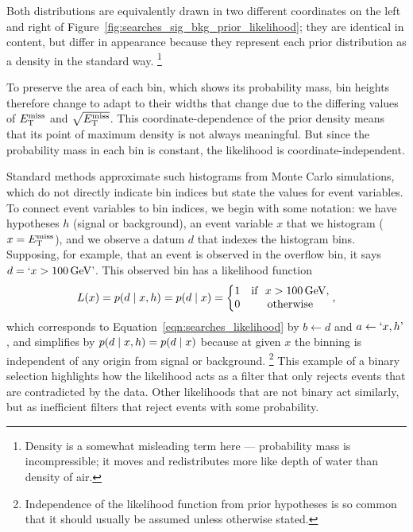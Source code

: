 Both distributions are equivalently drawn in two different coordinates
on the left and right of Figure~\ref{fig:searches_sig_bkg_prior_likelihood};
they are identical in content, but differ in appearance because they represent
each prior distribution as a density in the standard way.%
\footnote{%
Density is a somewhat misleading term here ---
probability mass is incompressible; it moves and redistributes more like
depth of water than density of air.%
}

To preserve the area of each bin, which shows its probability mass,
bin heights therefore change to adapt to their widths that change due to the
differing values of $\met$ and $\sqrt{\met}$.
This coordinate-dependence of the prior density means that its point of
maximum density is not always meaningful.
But since the probability mass in each bin is constant, the likelihood is
coordinate-independent.

Standard methods approximate such histograms from Monte Carlo simulations,
which do not directly indicate bin indices but state the values for event
variables.
To connect event variables to bin indices, we begin with some notation:
we have hypotheses $h$ (signal or background),
an event variable $x$ that we histogram ($x = \met$),
and we observe a datum $d$ that indexes the histogram bins.
Supposing, for example, that an event is observed in the overflow bin, it says
$d = `x > 100\,\eV[G]\textrm{'}$.
This observed bin has a likelihood function
\begin{equation}
L(x) = \prob{d}{x, h} = \prob{d}{x} =
\left\{
\begin{matrix}
1 & \textrm{if }~x > 100\,\eV[G], \\
0 & \textrm{otherwise} \\
\end{matrix}
\right.
,
\end{equation}
which corresponds to Equation~\ref{eqn:searches_likelihood} by
$b \leftarrow d$ and $a \leftarrow `x, h\textrm{'}$,
and simplifies by $\prob{d}{x, h} = \prob{d}{x}$ because at given $x$ the
binning is independent of any origin from signal or background.%
\footnote{%
Independence of the likelihood function from prior hypotheses is so common
that it should usually be assumed unless otherwise stated.
}
This example of a binary selection highlights how the likelihood acts as a
filter that only rejects events that are contradicted by the data.
Other likelihoods that are not binary act similarly, but as inefficient filters
that reject events with some probability.

